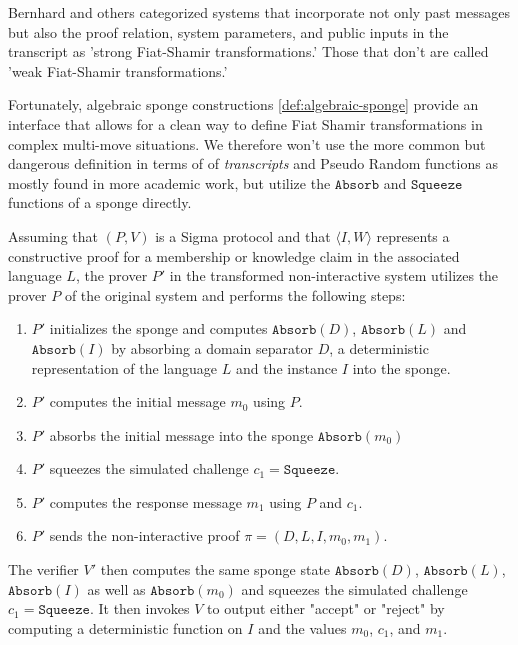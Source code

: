 Bernhard and others categorized systems that incorporate not only past messages but also the proof relation, system parameters, and public inputs in the transcript as 'strong Fiat-Shamir transformations.' Those that don't are called 'weak Fiat-Shamir transformations.'

Fortunately, algebraic sponge constructions \ref{def:algebraic-sponge} provide an interface that allows for a clean way to define Fiat Shamir transformations in complex multi-move situations. We therefore won't use the more common but dangerous definition in terms of of \textit{transcripts} and Pseudo Random functions as mostly found in more academic work, but utilize the $\mathtt{Absorb}$ and $\mathtt{Squeeze}$ functions of a sponge directly.

Assuming that $(P,V)$ is a Sigma protocol and that $\langle I, W\rangle$ represents a constructive proof for a membership or knowledge claim in the associated language $L$, the prover $P'$ in the transformed non-interactive system utilizes the prover $P$ of the original system and performs the following steps:
\begin{enumerate}
\label{def_sigma-model-fiat-shamir}
\item $P'$ initializes the sponge and computes $\mathtt{Absorb}(D)$, $\mathtt{Absorb}(L)$ and $\mathtt{Absorb}(I)$ by absorbing a domain separator $D$, a deterministic representation of the language $L$ and the instance $I$ into the sponge.
\item $P'$ computes the initial message $m_0$ using $P$.
\item $P'$ absorbs the initial message into the sponge $\mathtt{Absorb}(m_0)$
\item $P'$ squeezes the simulated challenge $c_1=\mathtt{Squeeze}$.
\item $P'$ computes the response message $m_1$ using $P$ and $c_1$.
\item $P'$ sends the non-interactive proof $\pi=(D,L,I,m_0,m_1)$.
\end{enumerate}
The verifier $V'$ then computes the same sponge state $\mathtt{Absorb}(D)$, $\mathtt{Absorb}(L)$, $\mathtt{Absorb}(I)$ as well as $\mathtt{Absorb}(m_0)$ and squeezes the simulated challenge $c_1=\mathtt{Squeeze}$. It then invokes $V$ to output either "accept" or "reject" by computing a deterministic function on $I$ and the values $m_0$, $c_1$, and $m_1$.


